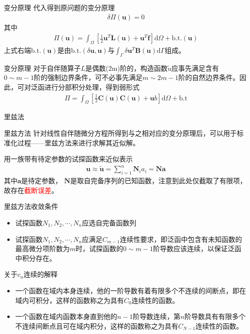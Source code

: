 \documentclass[11pt]{beamer}
\begin{document}
\begin{frame}{变分原理}
代入得到原问题的变分原理
\begin{align*}
\delta \Pi (\textbf{u})=0
\end{align*}
其中
\begin{align*}
\Pi(\textbf{u})=\int_{\Omega}\left[ \frac{1}{2}\textbf{u}^T \textbf{L}(\textbf{u})+\textbf{u}^T\textbf{f}\right] \mathrm{d}\Omega + \mathrm{b.t.}(\textbf{u})
\end{align*}
上式右端$\mathrm{b.t.}(\textbf{u})$是由$\mathrm{b.t.}(\delta \textbf{u},\textbf{u})$与$\int_\Gamma \delta{\textbf{u}}^T\textbf{B}(\textbf{u})\mathrm{d}\Gamma$组成。
\end{frame}


\begin{frame}{变分原理}
对于自伴随算子$L$是偶数(2m)阶的，构造函数$\tilde{u}$应事先满足含有$0\sim m-1$阶的强制边界条件，可不必事先满足$m\sim 2m-1$阶的自然边界条件。因此，可对泛函进行分部积分处理，得到弱形式
\begin{align*}
\Pi = \int_\Omega\left[\frac{1}{2}\textbf{C}(\textbf{u})\textbf{C}(\textbf{u})+\textbf{u} b\right] \mathrm{d}\Omega +\mathrm{b.t}
\end{align*}
\end{frame}

\begin{frame}{里兹法}
\begin{block}{里兹方法}
针对线性自伴随微分方程所得到与之相对应的变分原理后，可以用于标准化过程——里兹方法来进行求解其近似解。
\end{block}
用一族带有待定参数的试探函数来近似表示
\begin{align*}
\textbf{u} \approx \tilde{\textbf{u}}= \sum\limits_{i=1}^{n}\textbf{N}_i a_i=\textbf{N}\textbf{a}
\end{align*}
其中$\textbf{a}$是待定参数， $\textbf{N}$是取自完备序列的已知函数，注意到此处仅截取了有限项，故存在\textcolor{red}{截断误差}。
\end{frame}

\begin{frame}{里兹方法收敛条件}
\begin{itemize}
\item 试探函数$N_1,N_2,\cdots,N_n$应选自完备函数列
\item 试探函数$N_1,N_2,\cdots,N_n$应满足$C_{m-1}$连续性要求，即泛函中包含有未知函数的最高微分项阶数为$m$时，试探函数的$0\sim m-1$阶导数应该连续，以保证泛函中积分存在。
\end{itemize}
\begin{block}{关于$c_n$连续的解释}
\begin{itemize}
\item 一个函数在域内本身连续，他的一阶导数有着有限多个不连续的间断点，即在域内可积分，这样的函数称之为具有$C_0$连续性的函数。
\item 一个函数在域内函数本身直到他的$n-1$阶导数连续，第$n$阶导数具有有限多个不连续间断点且可在域内积分，这样的函数称之为具有$C_{N-1}$连续性的函数。
\end{itemize}
\end{block}
\end{frame}
\end{document}
